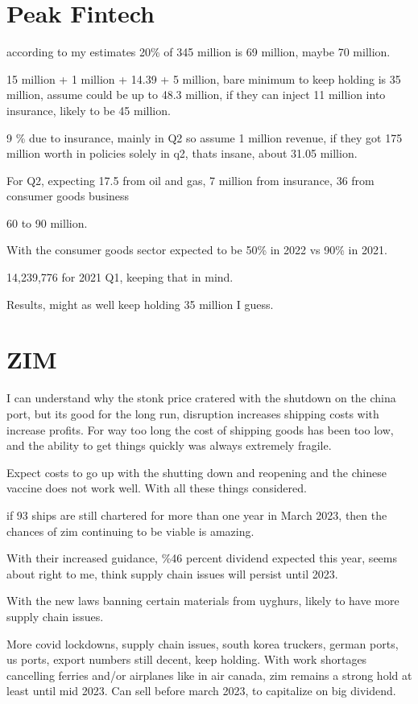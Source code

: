 \section{Peak Fintech}

according to my estimates 20\% of 345 million is 69 million, maybe 70 million.

15 million + 1 million + 14.39 + 5 million, bare minimum to keep holding is 35 million, assume could be up to 48.3 million, if they can inject 11 million into insurance, likely to be 45 million. 

9 \% due to insurance, mainly in Q2 so assume 1 million revenue, if they got 175 million worth in policies solely in q2, thats insane, about 31.05 million.

For Q2, expecting 17.5 from oil and gas, 7 million from insurance, 36 from consumer goods business

60 to 90 million.

With the consumer goods sector expected to be 50\% in 2022 vs 90\% in 2021.

14,239,776 for 2021 Q1, keeping that in mind.

Results, might as well keep holding 35 million I guess.

\section{ZIM}

I can understand why the stonk price cratered with the shutdown on the china port, but its good for the long run, disruption increases shipping costs with increase profits. For way too long the cost of shipping goods has been too low, and the ability to get things quickly was always extremely fragile.

Expect costs to go up with the shutting down and reopening and the chinese vaccine does not work well.
With all these things considered.

if 93 ships are still chartered for more than one year in March 2023, then the chances of zim continuing to be viable is amazing.

With their increased guidance, \%46 percent dividend expected this year, seems about right to me, think supply chain issues will persist until 2023.

With the new laws banning certain materials from uyghurs, likely to have more supply chain issues.

More covid lockdowns, supply chain issues, south korea truckers, german ports, us ports, export numbers still decent, keep holding. With work shortages cancelling ferries and/or airplanes like in air canada, zim remains a strong hold at least until mid 2023. Can sell before march 2023, to capitalize on big dividend.


